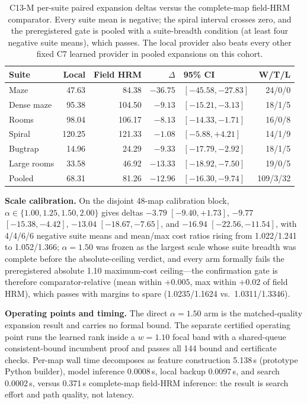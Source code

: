 \documentclass[letterpaper]{article} %
\newcommand{\stage}[1]{\textsc{#1}}
\begin{document}
\begin{table}[h]
\centering
\scriptsize
\setlength{\tabcolsep}{2.5pt}
\begin{tabular}{@{}lrrrlr@{}}
\toprule
Suite & Local & Field HRM & $\Delta$ & 95\% CI & W/T/L \\
\midrule
Maze & 47.63 & 84.38 & $-36.75$ & $[-45.58,-27.83]$ & 24/0/0 \\
Dense maze & 95.38 & 104.50 & $-9.13$ & $[-15.21,-3.13]$ & 18/1/5 \\
Rooms & 98.04 & 106.17 & $-8.13$ & $[-14.33,-1.71]$ & 16/0/8 \\
Spiral & 120.25 & 121.33 & $-1.08$ & $[-5.88,+4.21]$ & 14/1/9 \\
Bugtrap & 14.96 & 24.29 & $-9.33$ & $[-17.79,-2.92]$ & 18/1/5 \\
Large rooms & 33.58 & 46.92 & $-13.33$ & $[-18.92,-7.50]$ & 19/0/5 \\
\midrule
Pooled & 68.31 & 81.26 & $-12.96$ & $[-16.30,-9.74]$ & 109/3/32 \\
\bottomrule
\end{tabular}
\caption{\stage{C13-M} per-suite paired expansion deltas versus the complete-map field-HRM comparator. Every suite mean is negative; the spiral interval crosses zero, and the preregistered gate is pooled with a suite-breadth condition (at least four negative suite means), which passes. The local provider also beats every other fixed \stage{C7} learned provider in pooled expansions on this cohort.}
\label{tab:c13msuite}
\end{table}

\textbf{Scale calibration.} On the disjoint 48-map calibration block, $\alpha\in\{1.00,1.25,1.50,2.00\}$ gives deltas $-3.79$ $[-9.40,+1.73]$, $-9.77$ $[-15.38,-4.42]$, $-13.04$ $[-18.67,-7.65]$, and $-16.94$ $[-22.56,-11.54]$, with 4/4/6/6 negative suite means and mean/max cost ratios rising from 1.022/1.241 to 1.052/1.366; $\alpha{=}1.50$ was frozen as the largest scale whose suite breadth was complete before the absolute-ceiling verdict, and every arm formally fails the preregistered absolute 1.10 maximum-cost ceiling---the confirmation gate is therefore comparator-relative (mean within $+0.005$, max within $+0.02$ of field HRM), which passes with margins to spare (1.0235/1.1624 vs.\ 1.0311/1.3346).

\textbf{Operating points and timing.} The direct $\alpha{=}1.50$ arm is the matched-quality expansion result and carries no formal bound. The separate certified operating point runs the learned rank inside a $w{=}1.10$ focal band with a shared-queue consistent-bound incumbent proof and passes all 144 bound and certificate checks. Per-map wall time decomposes as feature construction 5.138\,s (prototype Python builder), model inference 0.0008\,s, local backup 0.0097\,s, and search 0.0002\,s, versus 0.371\,s complete-map field-HRM inference: the result is search effort and path quality, not latency.
\end{document}
